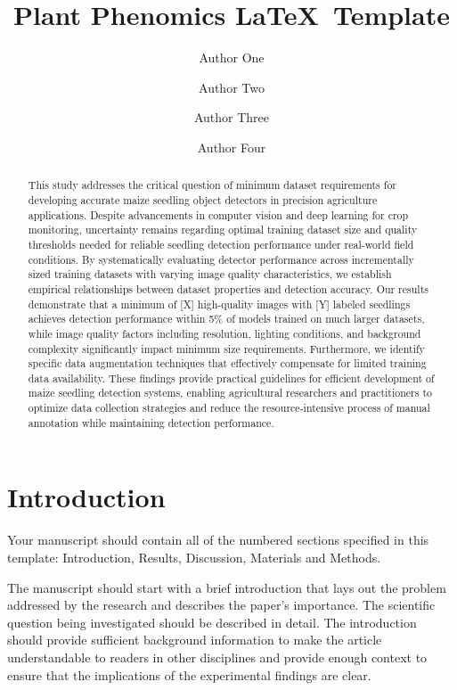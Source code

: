 \documentclass{article}
\title{Plant Phenomics \LaTeX\ Template}
\author[1*$\dag$]{Author One}
\author[2$\dag$]{Author Two}
\author[2]{Author Three}
\author[1,2]{Author Four}
\affil[1]{Department of Physics, A University, City, Country.}
\affil[2]{Department of Astronomy, B University, City, Country.}
\affil[*]{Address correspondence to: email@email.com}
\affil[$\dag$]{These authors contributed equally to this work.}
\date{}
\begin{document}
\maketitle

\begin{abstract}
This study addresses the critical question of minimum dataset requirements for developing accurate maize seedling object detectors in precision agriculture applications. Despite advancements in computer vision and deep learning for crop monitoring, uncertainty remains regarding optimal training dataset size and quality thresholds needed for reliable seedling detection performance under real-world field conditions. By systematically evaluating detector performance across incrementally sized training datasets with varying image quality characteristics, we establish empirical relationships between dataset properties and detection accuracy. Our results demonstrate that a minimum of [X] high-quality images with [Y] labeled seedlings achieves detection performance within 5\% of models trained on much larger datasets, while image quality factors including resolution, lighting conditions, and background complexity significantly impact minimum size requirements. Furthermore, we identify specific data augmentation techniques that effectively compensate for limited training data availability. These findings provide practical guidelines for efficient development of maize seedling detection systems, enabling agricultural researchers and practitioners to optimize data collection strategies and reduce the resource-intensive process of manual annotation while maintaining detection performance.
\end{abstract}


\section{Introduction}
Your manuscript should contain all of the numbered sections specified in this template: Introduction, 
Results, Discussion, Materials and Methods.

The manuscript should start with a brief introduction that lays out the problem addressed by the research 
and describes the paper’s importance. The scientific question being investigated should be described in detail. 
The introduction should provide sufficient background information to make the article understandable to readers 
in other disciplines and provide enough context to ensure that the implications of the experimental findings are 
clear. 
\end{document}
